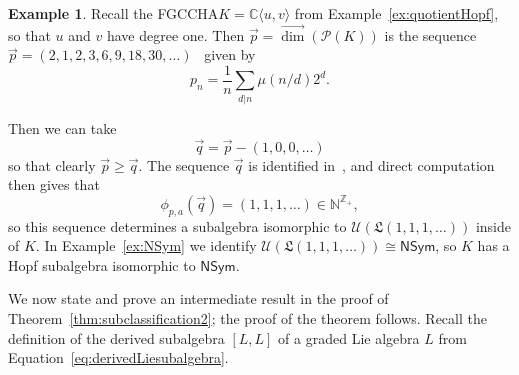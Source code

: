 \documentclass[11pt]{amsart}
\theoremstyle{definition}
\newtheorem{example}[theorem]{Example}
\numberwithin{equation}{section}
\def\NN{{\mathbb N}}
\def\CC{{\mathbb C}}
\def\ZZ{{\mathbb Z}}
\newcommand{\FGCCHA}{\textsf{FGCCHA}\xspace}
\newcommand{\vecdim}{\overrightarrow{\dim}}
\begin{document}
\begin{example}
\label{ex:NSymInCxy}
Recall the \FGCCHA $K = \CC\langle u, v \rangle$ from Example~\ref{ex:quotientHopf}, so that $u$ and $v$ have degree one.  Then $\vec{p} = \vecdim(\mathcal{P}(K))$ is the sequence
$\vec{p} = (2, 1, 2, 3, 6, 9, 18, 30,\ldots)$~\cite[\href{https://oeis.org/A001037}{A001037}]{OEIS} given by 
\[
p_{n} = \frac{1}{n} \sum_{d | n} \mu(n/d) 2^{d}.
\]

Then we can take 
\[
\vec{q} = \vec{p} - (1, 0, 0, \ldots)
\]
so that clearly $\vec{p} \ge \vec{q}$.  
The sequence $\vec{q}$ is identified in~\cite[\href{https://oeis.org/A059966}{A059966}]{OEIS}, and direct computation then gives that
\[
\phi_{p, a}(\vec{q}) = (1, 1, 1, \ldots) \in \NN^{\ZZ_{+}},
\]
so this sequence determines a subalgebra isomorphic to $\mathcal{U}(\mathfrak{L}(1, 1, 1, \ldots))$ inside of $K$.   
In Example~\ref{ex:NSym} we identify $\mathcal{U}(\mathfrak{L}(1, 1, 1, \ldots)) \cong \mathsf{NSym}$, so $K$ has a Hopf subalgebra isomorphic to $\mathsf{NSym}$.
\end{example}

We now state and prove an intermediate result in the proof of Theorem~\ref{thm:subclassification2}; the proof of the theorem follows.  Recall the definition of the derived subalgebra $[L, L]$ of a graded Lie algebra $L$ from Equation~\eqref{eq:derivedLiesubalgebra}.
\end{document}
